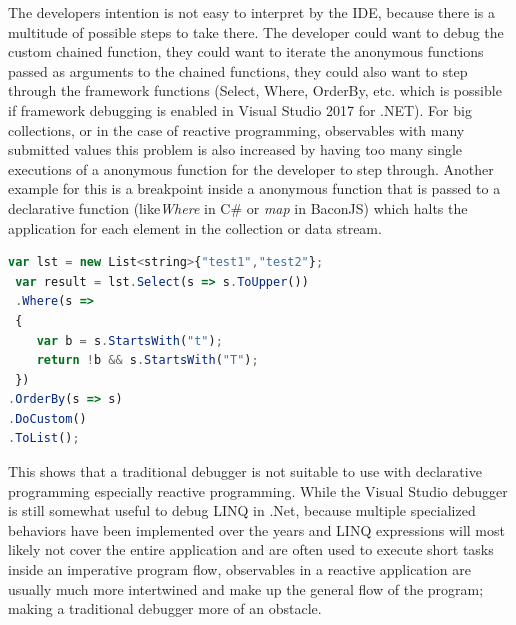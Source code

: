 The developers intention is not easy to interpret by the IDE, because there is a multitude of possible steps to take there. The developer could want to debug the custom chained function, they could want to iterate the anonymous functions passed as arguments to the chained functions, they could also want to step through the framework functions (Select, Where, OrderBy, etc. which is possible if framework debugging is enabled in Visual Studio 2017 for .NET). 
For big collections, or in the case of reactive programming, observables with many submitted values this problem is also increased by having too many single executions of a anonymous function for the developer to step through. Another example for this is a breakpoint inside a anonymous function that is passed to a declarative function (like\emph{Where} in C\# or \emph{map} in BaconJS) which halts the application for each element in the collection or data stream.

\begin{lstlisting}[language=JavaScript, caption={Simple example of .NET LINQ in C\# to show the steps the Visual Studio 2017 for .NET debugger takes while debugging step-by-step.},label={lst:CSharp_LINQ}]
 var lst = new List<string>{"test1","test2"};
 var result = lst.Select(s => s.ToUpper())
 .Where(s =>
 {
	var b = s.StartsWith("t");
	return !b && s.StartsWith("T");
 })
.OrderBy(s => s)
.DoCustom()
.ToList();
\end{lstlisting}


This shows that a traditional debugger is not suitable to use with declarative programming especially reactive programming. While the Visual Studio debugger is still somewhat useful to debug LINQ in .Net, because multiple specialized behaviors have been implemented over the years and LINQ expressions will most likely not cover the entire application and are often used to execute short tasks inside an imperative program flow, observables in a reactive application are usually much more intertwined and make up the general flow of the program; making a traditional debugger more of an obstacle.

